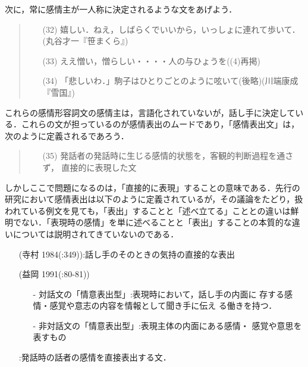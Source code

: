 次に，常に感情主が一人称に決定されるような文をあげよう．

\vspace{0.3cm}
\begin{quote}
\begin{itemize}
 \item[(32)] 嬉しい．ねえ，しばらくでいいから，いっしょに連れて歩いて．
	     (丸谷才一『笹まくら』)
 \item[(33)] ええ憎い，憎らしい・・・・人の与ひょうを((4)再掲) 
 \item[(34)] 「悲しいわ．」駒子はひとりごとのように呟いて(後略)(川端康成
	     『雪国』)
\end{itemize}
\end{quote}
\vspace{0.3cm}

これらの感情形容詞文の感情主は，言語化されていないが，話し手に決定してい
る．これらの文が担っているのが感情表出のムードであり，「感情表出文」は，
次のように定義されるであろう．

\vspace{0.3cm}
\begin{quote}
\begin{itemize}
 \item[(35)] 発話者の発話時に生じる感情的状態を，客観的判断過程を通さず，
	     直接的に表現した文
\end{itemize}
\end{quote}
\vspace{0.3cm}

しかしここで問題になるのは，「直接的に表現」することの意味である．先行の
研究において感情表出は以下のように定義されているが，その議論をたどり，扱
われている例文を見ても，「表出」することと「述べ立てる」こととの違いは鮮
明でない．「表現時の感情」を単に述べることと「表出」することの本質的な違
いについては説明されてきていないのである．

\vspace{0.3cm}
\begin{itemize}
 \item[] (寺村 1984(:349)):話し手のそのときの気持の直接的な表出
 \item[] (益岡 1991(:80-81))
	 \begin{itemize}
	  \item[-] 対話文の「情意表出型」:表現時において，話し手の内面に
		   存する感情・感覚や意志の内容を情報として聞き手に伝え
		   る働きを持つ．
	  \item[-] 非対話文の「情意表出型」:表現主体の内面にある感情・
		   感覚や意思を表すもの
	 \end{itemize}
 \item[] \cite{山岡1997}:発話時の話者の感情を直接表出する文．
\end{itemize}
\vspace{0.3cm}

